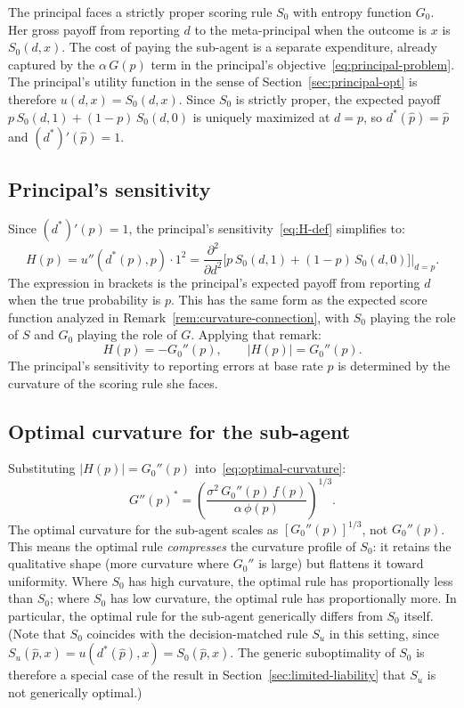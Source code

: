 \documentclass[11pt]{article}
\begin{document}
The principal faces a strictly proper scoring rule $S_0$ with entropy function $G_0$. Her gross payoff from reporting $d$ to the meta-principal when the outcome is $x$ is $S_0(d, x)$. The cost of paying the sub-agent is a separate expenditure, already captured by the $\alpha\,G(p)$ term in the principal's objective~\eqref{eq:principal-problem}. The principal's utility function in the sense of Section~\ref{sec:principal-opt} is therefore $u(d, x) = S_0(d, x)$. Since $S_0$ is strictly proper, the expected payoff $p\,S_0(d, 1) + (1-p)\,S_0(d, 0)$ is uniquely maximized at $d = p$, so $d^*(\hat{p}) = \hat{p}$ and $(d^*)'(\hat{p}) = 1$.

\subsection{Principal's sensitivity}

Since $(d^*)'(p) = 1$, the principal's sensitivity~\eqref{eq:H-def} simplifies to:
\[
H(p) = u''(d^*(p), p) \cdot 1^2 = \frac{\partial^2}{\partial d^2}\Big[p\,S_0(d, 1) + (1-p)\,S_0(d, 0)\Big]\bigg|_{d=p}.
\]
The expression in brackets is the principal's expected payoff from reporting $d$ when the true probability is $p$. This has the same form as the expected score function analyzed in Remark~\ref{rem:curvature-connection}, with $S_0$ playing the role of $S$ and $G_0$ playing the role of $G$. Applying that remark:
\begin{equation}\label{eq:H-subcontracting}
H(p) = -G_0''(p), \qquad |H(p)| = G_0''(p).
\end{equation}
The principal's sensitivity to reporting errors at base rate $p$ is determined by the curvature of the scoring rule she faces.

\subsection{Optimal curvature for the sub-agent}

Substituting $|H(p)| = G_0''(p)$ into~\eqref{eq:optimal-curvature}:
\begin{equation}\label{eq:optimal-curvature-subcontracting}
G''(p)^* = \left(\frac{\sigma^2\,G_0''(p)\,f(p)}{\alpha\,\phi(p)}\right)^{1/3}.
\end{equation}
The optimal curvature for the sub-agent scales as $[G_0''(p)]^{1/3}$, not $G_0''(p)$. This means the optimal rule \emph{compresses} the curvature profile of $S_0$: it retains the qualitative shape (more curvature where $G_0''$ is large) but flattens it toward uniformity. Where $S_0$ has high curvature, the optimal rule has proportionally less than $S_0$; where $S_0$ has low curvature, the optimal rule has proportionally more. In particular, the optimal rule for the sub-agent generically differs from $S_0$ itself. (Note that $S_0$ coincides with the decision-matched rule $S_u$ in this setting, since $S_u(\hat{p}, x) = u(d^*(\hat{p}), x) = S_0(\hat{p}, x)$. The generic suboptimality of $S_0$ is therefore a special case of the result in Section~\ref{sec:limited-liability} that $S_u$ is not generically optimal.)
\end{document}
